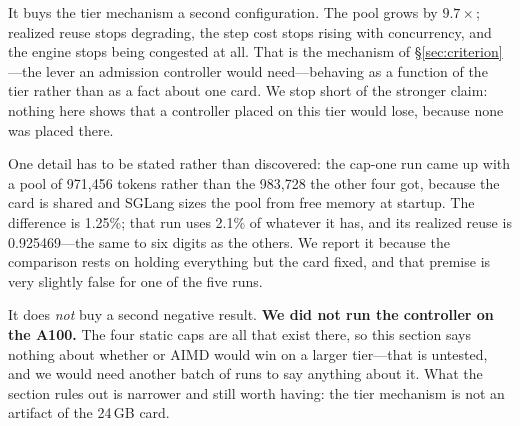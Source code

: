 It buys the tier mechanism a second configuration. The pool grows by
$9.7\times$; realized reuse stops degrading, the step cost stops rising with
concurrency, and the engine stops being congested at all. That is the
mechanism of \S\ref{sec:criterion}---the lever an admission controller would
need---behaving as a function of the tier rather than as a fact about one
card. We stop short of the stronger claim: nothing here shows that a
controller placed on this tier would lose, because none was placed there.

One detail has to be stated rather than discovered: the cap-one run came up
with a pool of 971{,}456 tokens rather than the 983{,}728 the other four got,
because the card is shared and SGLang sizes the pool from free memory at
startup. The difference is 1.25\%; that run uses 2.1\% of whatever it has, and
its realized reuse is 0.925469---the same to six digits as the others. We
report it because the comparison rests on holding everything but the card
fixed, and that premise is very slightly false for one of the five runs.

It does \emph{not} buy a second negative result. \textbf{We did not run the
controller on the A100.} The four static caps are all that exist there, so this
section says nothing about whether \sys{} or AIMD would win on a larger
tier---that is untested, and we would need another batch of runs to say
anything about it. What the section rules out is narrower and still worth
having: the tier mechanism is not an artifact of the 24\,GB card.
